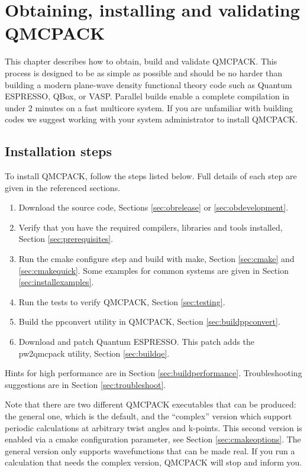 \chapter{Obtaining, installing and validating QMCPACK}
\label{chap:obtaininginstalling}

This chapter describes how to obtain, build and validate QMCPACK. This process is designed to be as simple as
possible and should be no harder than building a modern plane-wave density
functional theory code such as Quantum ESPRESSO, QBox, or
VASP. Parallel builds enable a complete
compilation in under 2 minutes on a fast multicore system. If you
are unfamiliar with building codes we suggest working with your system
administrator to install QMCPACK.

\section{Installation steps}
To install QMCPACK, follow the steps listed below. Full details of
each step are given in the referenced sections.
\begin{enumerate}
\item Download the source code, Sections \ref{sec:obrelease} or \ref{sec:obdevelopment}.
\item Verify that you have the required compilers, libraries and tools
  installed, Section \ref{sec:prerequisites}.
\item Run the cmake configure step and build with make, Section
  \ref{sec:cmake} and \ref{sec:cmakequick}. Some examples for common
  systems are given in Section \ref{sec:installexamples}.
\item Run the tests to verify QMCPACK, Section \ref{sec:testing}.
\item Build the ppconvert utility in QMCPACK, Section \ref{sec:buildppconvert}.
\item Download and patch Quantum ESPRESSO. This patch adds the
  pw2qmcpack utility, Section \ref{sec:buildqe}.
\end{enumerate}

Hints for high performance are in Section \ref{sec:buildperformance}. Troubleshooting suggestions are in Section \ref{sec:troubleshoot}.

Note that there are two different QMCPACK executables that can be
produced: the general one, which is the default, and the ``complex''
version which support periodic calculations at arbitrary twist angles and
k-points. This second version is enabled via a cmake configuration
parameter, see Section \ref{sec:cmakeoptions}. The general version
only supports wavefunctions that can be made real. If you run a
calculation that needs the complex version, QMCPACK will stop and inform you.

